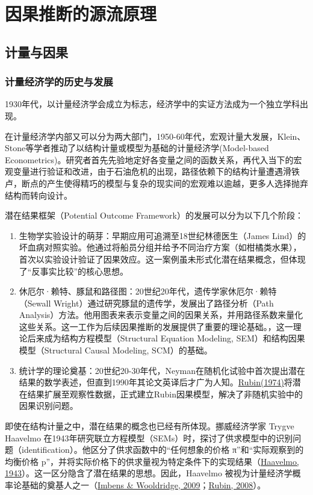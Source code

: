 \chapter{因果推断的源流原理}
\section{计量与因果}
\subsection{计量经济学的历史与发展}

1930年代，以计量经济学会成立为标志，经济学中的实证方法成为一个独立学科出现。

在计量经济学内部又可以分为两大部门，1950-60年代，宏观计量大发展，Klein、Stone等学者推动了以结构计量或模型为基础的计量经济学(Model-based Econometrics)。研究者首先先验地定好各变量之间的函数关系，再代入当下的宏观变量进行验证和改进，由于石油危机的出现，路径依赖下的结构计量遭遇滑铁卢，断点的产生使得精巧的模型与复杂的现实间的宏观难以逾越，更多人选择抛弃结构而转向设计。

潜在结果框架（Potential Outcome Framework）的发展可以分为以下几个阶段：

\begin{enumerate}
	\item 生物学实验设计的萌芽：早期应用可追溯至18世纪林德医生（James Lind）的坏血病对照实验。他通过将船员分组并给予不同治疗方案（如柑橘类水果），首次以实验设计验证了因果效应。这一案例虽未形式化潜在结果概念，但体现了“反事实比较”的核心思想。
	\item 休厄尔·赖特、豚鼠和路径图：20世纪20年代，遗传学家休厄尔·赖特（Sewall Wright）通过研究豚鼠的遗传学，发展出了路径分析（Path Analysis）方法。他用图表来表示变量之间的因果关系，并用路径系数来量化这些关系。这一工作为后续因果推断的发展提供了重要的理论基础。，这一理论后来成为结构方程模型（Structural Equation Modeling, SEM）和结构因果模型（Structural Causal Modeling, SCM）的基础。
	\item 统计学的理论奠基：20世纪20-30年代，Neyman在随机化试验中首次提出潜在结果的数学表述，但直到1990年其论文英译后才广为人知。\href{https://doi.org/10.1037/h0037350}{Rubin(1974)}将潜在结果扩展至观察性数据，正式建立Rubin因果模型，解决了非随机实验中的因果识别问题。
\end{enumerate}

即使在结构计量之中，潜在结果的概念也已经有所体现。挪威经济学家 Trygve Haavelmo 在1943年研究联立方程模型（SEMs）时，探讨了供求模型中的识别问题（identification）。他区分了供求函数中的“任何想象的价格 π”和“实际观察到的均衡价格 p”，并将实际价格下的供求量视为特定条件下的实现结果（\href{https://doi.org/10.2307/1905714}{Haavelmo, 1943}）。这一区分隐含了潜在结果的思想。因此，Haavelmo 被视为计量经济学概率论基础的奠基人之一（\href{https://doi.org/10.1257/jel.47.1.5}{Imbens \& Wooldridge, 2009}；\href{https://doi.org/10.1214/08-AOAS187}{Rubin, 2008}）。

